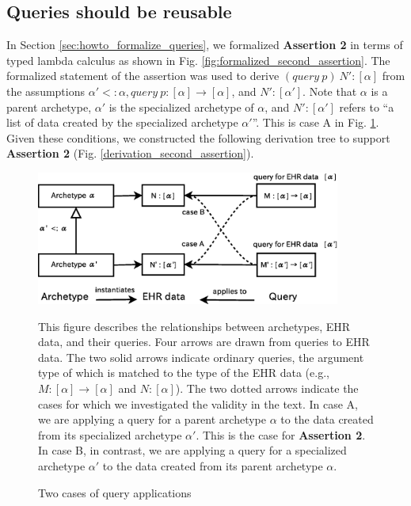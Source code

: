 \documentclass[preprint,3p,onecolumn,times,review]{elsarticle}
\begin{document}
\subsection{Queries should be reusable}

In Section \ref{sec:howto_formalize_queries}, we formalized {\bf Assertion 2} in terms of typed lambda calculus as shown in Fig. \ref{fig:formalized_second_assertion}.
The formalized statement of the assertion was used to derive $(query~p)~N' :[\alpha]$ from the assumptions $\alpha' <: \alpha, query~p:[\alpha] \rightarrow [\alpha]$, and $N':[\alpha']$.
Note that $\alpha$ is a parent archetype, $\alpha'$ is the specialized archetype of $\alpha$, and $N' : [\alpha']$ refers to ``a list of data created by the specialized archetype $\alpha'$''.
This is case A in Fig. \ref{fig:archetype_queries}. Given these conditions, we constructed the following derivation tree to support {\bf Assertion 2} (Fig. \ref{derivation_second_assertion}).


\begin{figure}[!htbp]
  \begin{center}
    \includegraphics[width=10cm,clip]{archetype_based_queries.eps}  
  \end{center}
  \caption{Two cases of query applications}\label{fig:archetype_queries}
  This figure describes the relationships between archetypes, EHR data, and their queries. Four arrows are drawn from queries to EHR data. The two solid arrows indicate ordinary queries, the argument type of which is matched to the type of the EHR data (e.g., $M:[\alpha] \rightarrow [\alpha]$ and $N:[\alpha]$). The two dotted arrows indicate the cases for which we investigated the validity in the text. In case A, we are applying a query for a parent archetype $\alpha$ to the data created from its specialized archetype $\alpha'$. This is the case for {\bf Assertion 2}. In case B, in contrast, we are applying a query for a specialized archetype $\alpha'$ to the data created from its parent archetype $\alpha$.
\end{figure}
\end{document}

